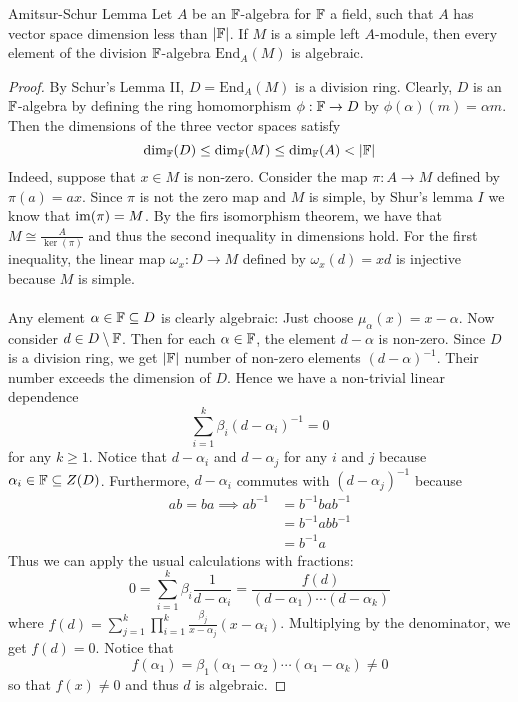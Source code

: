 \documentclass[a4paper]{article}
\begin{document}
\begin{thm}{Amitsur-Schur Lemma}{} Let $A$ be an $\mathbb{F}$-algebra for $\mathbb{F}$ a field, such that $A$ has vector space dimension less than $\abs{\mathbb{F}}$. If $M$ is a simple left $A$-module, then every element of the division $\mathbb{F}$-algebra $\text{End}_A(M)$ is algebraic. \tcbline
\begin{proof}
By Schur's Lemma II, $D=\text{End}_A(M)$ is a division ring. Clearly, $D$ is an $\mathbb{F}$-algebra by defining the ring homomorphism $\phi:\mathbb{F}\to D$ by $\phi(\alpha)(m)=\alpha m$. Then the dimensions of the three vector spaces satisfy $$\dim_{\mathbb{F}}(D)\leq\dim_{\mathbb{F}}(M)\leq\dim_{\mathbb{F}}(A)<\abs{\mathbb{F}}$$ Indeed, suppose that $x\in M$ is non-zero. Consider the map $\pi:A\to M$ defined by $\pi(a)=ax$. Since $\pi$ is not the zero map and $M$ is simple, by Shur's lemma $I$ we know that $\operatorname{im}(\pi)=M$. By the firs isomorphism theorem, we have that $M\cong\frac{A}{\ker(\pi)}$ and thus the second inequality in dimensions hold. For the first inequality, the linear map $\omega_x:D\to M$ defined by $\omega_x(d)=xd$ is injective because $M$ is simple. \\~\\

Any element $\alpha\in\mathbb{F}\subseteq D$ is clearly algebraic: Just choose $\mu_\alpha(x)=x-\alpha$. Now consider $d\in D\setminus\mathbb{F}$. Then for each $\alpha\in\mathbb{F}$, the element $d-\alpha$ is non-zero. Since $D$ is a division ring, we get $\abs{\mathbb{F}}$ number of non-zero elements $(d-\alpha)^{-1}$. Their number exceeds the dimension of $D$. Hence we have a non-trivial linear dependence $$\sum_{i=1}^k\beta_i(d-\alpha_i)^{-1}=0$$ for any $k\geq 1$. Notice that $d-\alpha_i$ and $d-\alpha_j$ for any $i$ and $j$ because $\alpha_i\in\mathbb{F}\subseteq Z(D)$. Furthermore, $d-\alpha_i$ commutes with $(d-\alpha_j)^{-1}$ because 
\begin{align*}
ab=ba\implies ab^{-1}&=b^{-1}bab^{-1}\\
&=b^{-1}abb^{-1}\\
&=b^{-1}a
\end{align*}
Thus we can apply the usual calculations with fractions: $$0=\sum_{i=1}^k\beta_i\frac{1}{d-\alpha_i}=\frac{f(d)}{(d-\alpha_1)\cdots(d-\alpha_k)}$$ where $f(d)=\sum_{j=1}^k\prod_{i=1}^k\frac{\beta_j}{x-\alpha_j}(x-\alpha_i)$. Multiplying by the denominator, we get $f(d)=0$. Notice that $$f(\alpha_1)=\beta_1(\alpha_1-\alpha_2)\cdots(\alpha_1-\alpha_k)\neq 0$$ so that $f(x)\neq 0$ and thus $d$ is algebraic. 
\end{proof}
\end{thm}
\end{document}
